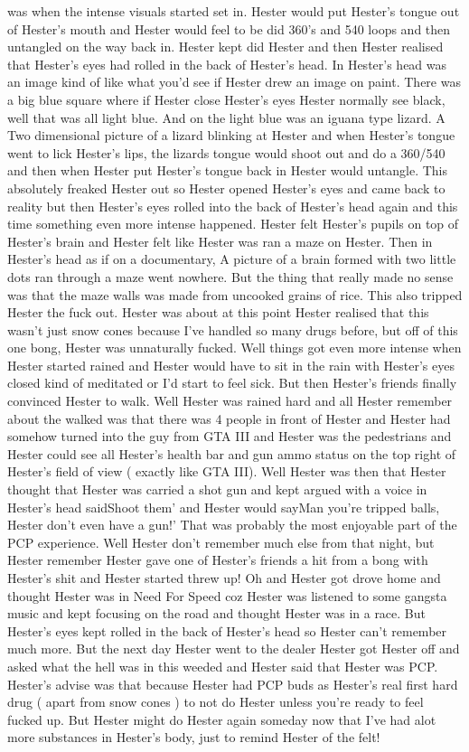 \documentclass[12pt]{book}
\begin{document}
was when the intense visuals started set in. Hester would put Hester's tongue out of Hester's mouth and Hester would feel to be did 360's and 540 loops and then untangled on the way back in. Hester kept did Hester and then Hester realised that Hester's eyes had rolled in the back of Hester's head. In Hester's head was an image kind of like what you'd see if Hester drew an image on paint. There was a big blue square where if Hester close Hester's eyes Hester normally see black, well that was all light blue. And on the light blue was an iguana type lizard. A Two dimensional picture of a lizard blinking at Hester and when Hester's tongue went to lick Hester's lips, the lizards tongue would shoot out and do a 360/540 and then when Hester put Hester's tongue back in Hester would untangle. This absolutely freaked Hester out so Hester opened Hester's eyes and came back to reality but then Hester's eyes rolled into the back of Hester's head again and this time something even more intense happened. Hester felt Hester's pupils on top of Hester's brain and Hester felt like Hester was ran a maze on Hester. Then in Hester's head as if on a documentary, A picture of a brain formed with two little dots ran through a maze went nowhere. But the thing that really made no sense was that the maze walls was made from uncooked grains of rice. This also tripped Hester the fuck out. Hester was about at this point Hester realised that this wasn't just snow cones because I've handled so many drugs before, but off of this one bong, Hester was unnaturally fucked. Well things got even more intense when Hester started rained and Hester would have to sit in the rain with Hester's eyes closed kind of meditated or I'd start to feel sick. But then Hester's friends finally convinced Hester to walk. Well Hester was rained hard and all Hester remember about the walked was that there was 4 people in front of Hester and Hester had somehow turned into the guy from GTA III and Hester was the pedestrians and Hester could see all Hester's health bar and gun ammo status on the top right of Hester's field of view ( exactly like GTA III). Well Hester was then that Hester thought that Hester was carried a shot gun and kept argued with a voice in Hester's head saidShoot them' and Hester would sayMan you're tripped balls, Hester don't even have a gun!' That was probably the most enjoyable part of the PCP experience. Well Hester don't remember much else from that night, but Hester remember Hester gave one of Hester's friends a hit from a bong with Hester's shit and Hester started threw up! Oh and Hester got drove home and thought Hester was in Need For Speed coz Hester was listened to some gangsta music and kept focusing on the road and thought Hester was in a race. But Hester's eyes kept rolled in the back of Hester's head so Hester can't remember much more. But the next day Hester went to the dealer Hester got Hester off and asked what the hell was in this weeded and Hester said that Hester was PCP. Hester's advise was that because Hester had PCP buds as Hester's real first hard drug ( apart from snow cones ) to not do Hester unless you're ready to feel fucked up. But Hester might do Hester again someday now that I've had alot more substances in Hester's body, just to remind Hester of the felt!
\end{document}
